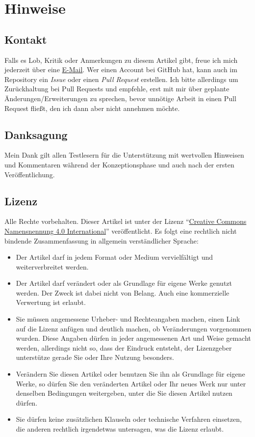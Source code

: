 \clearpage
{}
\printbibliography[title = {Quellen}, heading=bibnumbered]
\clearpage

\chapter{Hinweise}
\section{Kontakt}
Falls es Lob, Kritik oder Anmerkungen zu diesem Artikel gibt, freue ich mich jederzeit über eine \href{https://kreuvf.de/impressum.php}{E-Mail}. Wer einen Account bei GitHub hat, kann auch im Repository ein \emph{Issue} oder einen \emph{Pull Request} erstellen. Ich bitte allerdings um Zurückhaltung bei Pull Requests und empfehle, erst mit mir über geplante Änderungen/Erweiterungen zu sprechen, bevor unnötige Arbeit in einen Pull Request fließt, den ich dann aber nicht annehmen möchte.

\section{Danksagung}
Mein Dank gilt allen Testlesern für die Unterstützung mit wertvollen Hinweisen und Kommentaren während der Konzeptionsphase und auch nach der ersten Veröffentlichung.

\section{Lizenz}
Alle Rechte vorbehalten.
Dieser Artikel ist unter der Lizenz \enquote{\href{https://creativecommons.org/licenses/by/4.0/legalcode.de}{Creative Commons Namensnennung 4.0 International}} veröffentlicht. Es folgt eine rechtlich nicht bindende Zusammenfassung in allgemein verständlicher Sprache:
\begin{itemize}
	\item Der Artikel darf in jedem Format oder Medium vervielfältigt und weiterverbreitet werden.
	\item Der Artikel darf verändert oder als Grundlage für eigene Werke genutzt werden. Der Zweck ist dabei nicht von Belang. Auch eine kommerzielle Verwertung ist erlaubt.
	\item Sie müssen angemessene Urheber- und Rechteangaben machen, einen Link auf die Lizenz anfügen und deutlich machen, ob Veränderungen vorgenommen wurden. Diese Angaben dürfen in jeder angemessenen Art und Weise gemacht werden, allerdings nicht so, dass der Eindruck entsteht, der Lizenzgeber unterstütze gerade Sie oder Ihre Nutzung besonders.
	\item Verändern Sie diesen Artikel oder benutzen Sie ihn als Grundlage für eigene Werke, so dürfen Sie den veränderten Artikel oder Ihr neues Werk nur unter denselben Bedingungen weitergeben, unter die Sie diesen Artikel nutzen dürfen.
	\item Sie dürfen keine zusätzlichen Klauseln oder technische Verfahren einsetzen, die anderen rechtlich irgendetwas untersagen, was die Lizenz erlaubt.
\end{itemize}

